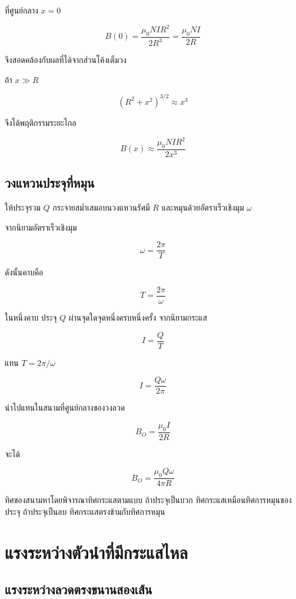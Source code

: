 ที่ศูนย์กลาง $x=0$

\[
B(0)
=
\frac{\mu_0 NI R^2}{2R^3}
=
\frac{\mu_0 NI}{2R}
\]

จึงสอดคล้องกับผลที่ได้จากส่วนโค้งเต็มวง

ถ้า $x\gg R$

\[
(R^2+x^2)^{3/2}\approx x^3
\]

จึงได้พฤติกรรมระยะไกล

\[
B(x)\approx\frac{\mu_0 NI R^2}{2x^3}
\]

\subsection{วงแหวนประจุที่หมุน}

ให้ประจุรวม $Q$ กระจายสม่ำเสมอบนวงแหวนรัศมี $R$ และหมุนด้วยอัตราเร็วเชิงมุม $\omega$

จากนิยามอัตราเร็วเชิงมุม

\[
\omega=\frac{2\pi}{T}
\]

ดังนั้นคาบคือ

\[
T=\frac{2\pi}{\omega}
\]

ในหนึ่งคาบ ประจุ $Q$ ผ่านจุดใดจุดหนึ่งครบหนึ่งครั้ง จากนิยามกระแส

\[
I=\frac{Q}{T}
\]

แทน $T=2\pi/\omega$

\begin{tcolorbox}[title={กระแสสมมูลของวงแหวนประจุที่หมุน}]
\[
\boxed{I=\frac{Q\omega}{2\pi}}
\]
\end{tcolorbox}

นำไปแทนในสนามที่ศูนย์กลางของวงลวด

\[
B_O=\frac{\mu_0 I}{2R}
\]

จะได้

\begin{tcolorbox}[title={สนามที่ศูนย์กลางของวงแหวนประจุที่หมุน}]
\[
\boxed{
B_O
=
\frac{\mu_0 Q\omega}{4\pi R}}
\]
\end{tcolorbox}

ทิศของสนามหาโดยพิจารณาทิศกระแสตามแบบ ถ้าประจุเป็นบวก ทิศกระแสเหมือนทิศการหมุนของประจุ ถ้าประจุเป็นลบ ทิศกระแสตรงข้ามกับทิศการหมุน

\section{แรงระหว่างตัวนำที่มีกระแสไหล}

\subsection{แรงระหว่างลวดตรงขนานสองเส้น}

